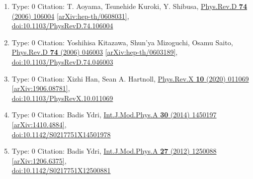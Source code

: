 \documentclass[a4paper,10pt]{article}
\begin{document}
\begin{enumerate}
\begin{enumerate}
  \item Type: 0 Citation: T. Aoyama, Tsunehide Kuroki, Y. Shibusa, \href{https://www.doi.org/10.1103/PhysRevD.74.106004}{Phys.Rev.D {\bf 74} (2006) 106004}  \href{https://arxiv.org/abs/hep-th/0608031}{[arXiv:hep-th/0608031]},\\\href{https://www.doi.org/10.1103/PhysRevD.74.106004}{doi:10.1103/PhysRevD.74.106004}
  \item Type: 0 Citation: Yoshihisa Kitazawa, Shun'ya Mizoguchi, Osamu Saito, \href{https://www.doi.org/10.1103/PhysRevD.74.046003}{Phys.Rev.D {\bf 74} (2006) 046003}  \href{https://arxiv.org/abs/hep-th/0603189}{[arXiv:hep-th/0603189]},\\\href{https://www.doi.org/10.1103/PhysRevD.74.046003}{doi:10.1103/PhysRevD.74.046003}
  \item Type: 0 Citation: Xizhi Han, Sean A. Hartnoll, \href{https://www.doi.org/10.1103/PhysRevX.10.011069}{Phys.Rev.X {\bf 10} (2020) 011069}  \href{https://arxiv.org/abs/1906.08781}{[arXiv:1906.08781]},\\\href{https://www.doi.org/10.1103/PhysRevX.10.011069}{doi:10.1103/PhysRevX.10.011069}
  \item Type: 0 Citation: Badis Ydri, \href{https://www.doi.org/10.1142/S0217751X14501978}{Int.J.Mod.Phys.A {\bf 30} (2014) 1450197}  \href{https://arxiv.org/abs/1410.4884}{[arXiv:1410.4884]},\\\href{https://www.doi.org/10.1142/S0217751X14501978}{doi:10.1142/S0217751X14501978}
  \item Type: 0 Citation: Badis Ydri, \href{https://www.doi.org/10.1142/S0217751X12500881}{Int.J.Mod.Phys.A {\bf 27} (2012) 1250088}  \href{https://arxiv.org/abs/1206.6375}{[arXiv:1206.6375]},\\\href{https://www.doi.org/10.1142/S0217751X12500881}{doi:10.1142/S0217751X12500881}

\end{enumerate}
\end{enumerate}
\end{document}
